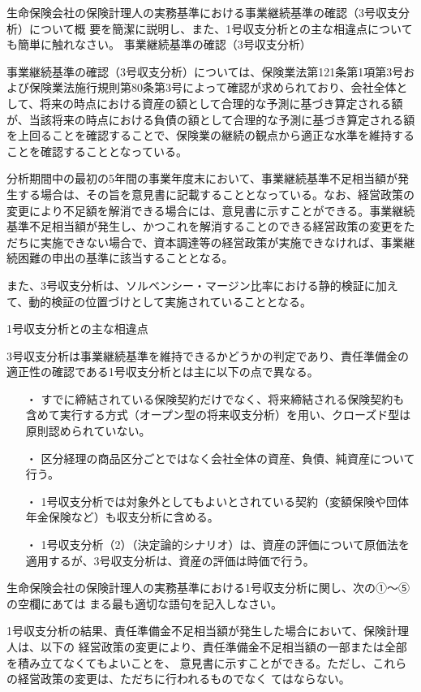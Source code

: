 \documentclass[report,gutter=10mm,fore-edge=10mm,uplatex,dvipdfmx]{jlreq}
\begin{document}
生命保険会社の保険計理人の実務基準における事業継続基準の確認（3号収支分析）について概
要を簡潔に説明し、また、1号収支分析との主な相違点についても簡単に触れなさい。
\answer{}
事業継続基準の確認（3号収支分析）

事業継続基準の確認（3号収支分析）については、保険業法第121条第1項第3号および保険業法施行規則第80条第3号によって確認が求められており、会社全体として、将来の時点における資産の額として合理的な予測に基づき算定される額が、当該将来の時点における負債の額として合理的な予測に基づき算定される額を上回ることを確認することで、保険業の継続の観点から適正な水準を維持することを確認することとなっている。

分析期間中の最初の5年間の事業年度末において、事業継続基準不足相当額が発生する場合は、その旨を意見書に記載することとなっている。なお、経営政策の変更により不足額を解消できる場合には、意見書に示すことができる。事業継続基準不足相当額が発生し、かつこれを解消することのできる経営政策の変更をただちに実施できない場合で、資本調達等の経営政策が実施できなければ、事業継続困難の申出の基準に該当することとなる。

また、3号収支分析は、ソルベンシー・マージン比率における静的検証に加えて、動的検証の位置づけとして実施されていることとなる。

1号収支分析との主な相違点

3号収支分析は事業継続基準を維持できるかどうかの判定であり、責任準備金の適正性の確認である1号収支分析とは主に以下の点で異なる。

\begin{itemize}
\item[ ・] すでに締結されている保険契約だけでなく、将来締結される保険契約も含めて実行する方式（オープン型の将来収支分析）を用い、クローズド型は原則認められていない。
\item[ ・] 区分経理の商品区分ごとではなく会社全体の資産、負債、純資産について行う。
\item[ ・] 1号収支分析では対象外としてもよいとされている契約（変額保険や団体年金保険など）も収支分析に含める。
\item[ ・] 1号収支分析（2）（決定論的シナリオ）は、資産の評価について原価法を適用するが、3号収支分析は、資産の評価は時価で行う。
\end{itemize}


生命保険会社の保険計理人の実務基準における1号収支分析に関し、次の①〜⑤の空欄にあては
まる最も適切な語句を記入しなさい。

1号収支分析の結果、責任準備金不足相当額が発生した場合において、保険計理人は、以下の
経営政策の変更により、責任準備金不足相当額の一部または全部を積み立てなくてもよいことを、
意見書に示すことができる。ただし、これらの経営政策の変更は、ただちに行われるものでなく
てはならない。
\end{document}
